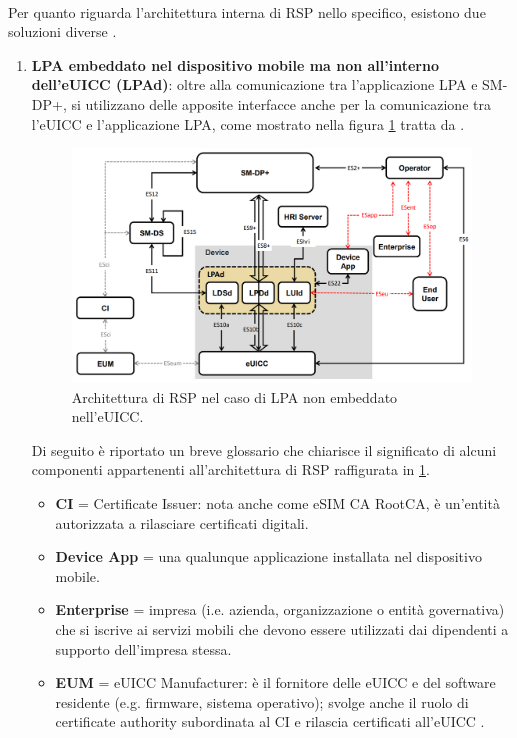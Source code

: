 \documentclass[10pt, oneside]{book}
\begin{document}
\\Per quanto riguarda l'architettura interna di RSP nello specifico, esistono due soluzioni diverse \cite{GSMA-docs-new}.
\begin{enumerate}
\item \textbf{LPA embeddato nel dispositivo mobile ma non all'interno dell'eUICC (LPAd)}: oltre alla comunicazione tra l'applicazione LPA e SM-DP+, si utilizzano delle apposite interfacce anche per la comunicazione tra l'eUICC e l'applicazione LPA, come mostrato nella figura \ref{fig:RSP-LPAd} tratta da \cite{GSMA-docs-new}.
\begin{figure}
\includegraphics[width=\linewidth]{RSP-LPAd.png}
\caption{Architettura di RSP nel caso di LPA non embeddato nell'eUICC.}
\label{fig:RSP-LPAd}
\end{figure}
Di seguito è riportato un breve glossario che chiarisce il significato di alcuni componenti appartenenti all'architettura di RSP raffigurata in \ref{fig:RSP-LPAd}.
\begin{itemize}
\item \textbf{CI} = Certificate Issuer: nota anche come eSIM CA RootCA, è un'entità autorizzata a rilasciare certificati digitali.
\item \textbf{Device App} = una qualunque applicazione installata nel dispositivo mobile.
\item \textbf{Enterprise} = impresa (i.e. azienda, organizzazione o entità governativa) che si iscrive ai servizi mobili che devono essere utilizzati dai dipendenti a supporto dell'impresa stessa.
\item \textbf{EUM} = eUICC Manufacturer: è il fornitore delle eUICC e del software residente (e.g. firmware, sistema operativo); svolge anche il ruolo di certificate authority subordinata al CI e rilascia certificati all'eUICC \cite{GSMA-docs-new}\cite{Sec-analysis}.

\end{itemize}
\end{enumerate}
\end{document}
